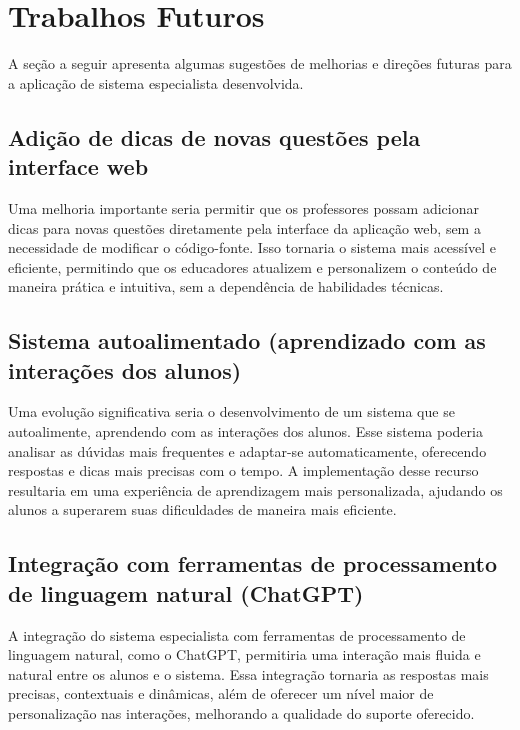 \section{Trabalhos Futuros}

A seção a seguir apresenta algumas sugestões de melhorias e direções futuras para a aplicação de sistema especialista desenvolvida. 

\subsection{Adição de dicas de novas questões pela interface web}
Uma melhoria importante seria permitir que os professores possam adicionar dicas para novas questões diretamente pela interface da aplicação web, sem a necessidade de modificar o código-fonte. Isso tornaria o sistema mais acessível e eficiente, permitindo que os educadores atualizem e personalizem o conteúdo de maneira prática e intuitiva, sem a dependência de habilidades técnicas.

\subsection{Sistema autoalimentado (aprendizado com as interações dos alunos)}
Uma evolução significativa seria o desenvolvimento de um sistema que se autoalimente, aprendendo com as interações dos alunos. Esse sistema poderia analisar as dúvidas mais frequentes e adaptar-se automaticamente, oferecendo respostas e dicas mais precisas com o tempo. A implementação desse recurso resultaria em uma experiência de aprendizagem mais personalizada, ajudando os alunos a superarem suas dificuldades de maneira mais eficiente.

\subsection{Integração com ferramentas de processamento de linguagem natural (ChatGPT)}
A integração do sistema especialista com ferramentas de processamento de linguagem natural, como o ChatGPT, permitiria uma interação mais fluida e natural entre os alunos e o sistema. Essa integração tornaria as respostas mais precisas, contextuais e dinâmicas, além de oferecer um nível maior de personalização nas interações, melhorando a qualidade do suporte oferecido.



